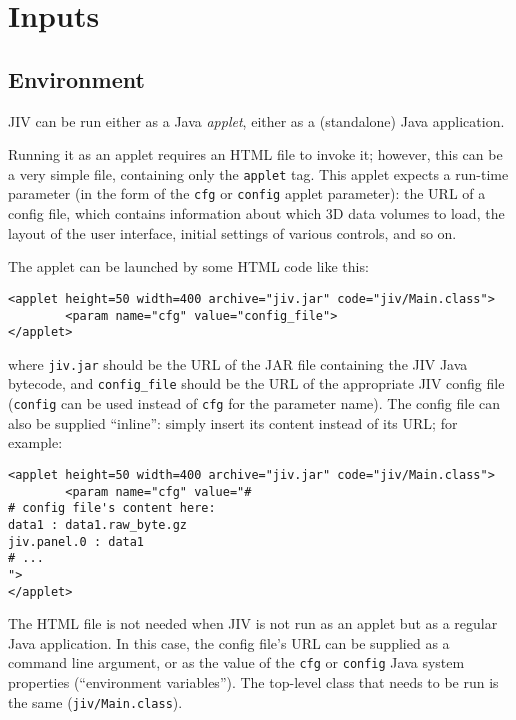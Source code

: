 %
%
%

\section{Inputs}
\label{sec:inputs}


\subsection{Environment}
\label{sec:environment}

JIV can be run either as a Java {\em applet}, either as a (standalone)
Java application. 

Running it as an applet requires an HTML file to invoke it; however,
this can be a very simple file, containing only the \verb+applet+ tag.
This applet expects a run-time parameter (in the form of the
\verb+cfg+ or \verb+config+ applet parameter): the URL of a config
file, which contains information about which 3D data volumes to load,
the layout of the user interface, initial settings of various
controls, and so on.

The applet can be launched by some HTML code like this:
\begin{verbatim}
<applet height=50 width=400 archive="jiv.jar" code="jiv/Main.class">
        <param name="cfg" value="config_file">
</applet>
\end{verbatim}
where \verb+jiv.jar+ should be the URL of the JAR file containing the
JIV Java bytecode, and \verb+config_file+ should be the URL of the
appropriate JIV config file (\verb+config+ can be used instead of
\verb+cfg+ for the parameter name). The config file can also be
supplied ``inline'': simply insert its content instead of its URL; for
example:
\begin{verbatim}
<applet height=50 width=400 archive="jiv.jar" code="jiv/Main.class">
        <param name="cfg" value="#
# config file's content here:
data1 : data1.raw_byte.gz
jiv.panel.0 : data1
# ...
">
</applet>
\end{verbatim}

The HTML file is not needed when JIV is not run as an applet but as a
regular Java application. In this case, the config file's URL can be
supplied as a command line argument, or as the value of the \verb+cfg+
or \verb+config+ Java system properties (``environment variables'').
The top-level class that needs to be run is the same
(\verb+jiv/Main.class+).



